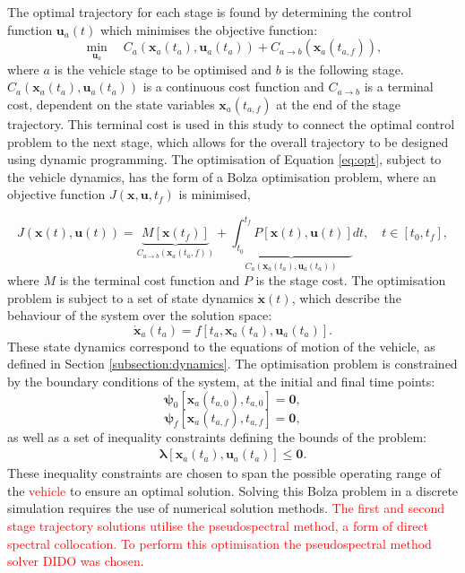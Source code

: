 \documentclass[journal]{new-aiaa}
\begin{document}
 The optimal trajectory for each stage is found by determining the control function $\textbf{u}_a(t)$ which minimises the objective function:
\begin{equation} \label{eq:opt}
\min\limits_{\textbf{u}_a} \quad C_a(\textbf{x}_a(t_a),\textbf{u}_a(t_a)) + C_{a\rightarrow  b}(\textbf{x}_a(t_{a,f})),
\end{equation}
where $a$ is the vehicle stage to be optimised and $b$ is the following stage. $ C_a(\textbf{x}_a(t_a),\textbf{u}_a(t_a))$ is a continuous cost function and $C_{{a\rightarrow b}}$ is a terminal cost, dependent on the state variables $\textbf{x}_a(t_{a,f})$ at the end of the stage trajectory. This terminal cost is used in this study to connect the optimal control problem to the next stage, which allows for the overall trajectory to be designed using dynamic programming.
The optimisation of Equation \ref{eq:opt}, subject to the vehicle dynamics, has the form of a Bolza optimisation problem, where an objective function $J(\textbf{x},\textbf{u},t_f)$ is minimised,

\begin{equation} \label{eq:cost}
J(\textbf{x}(t),\textbf{u}(t)) = \underbrace{M[\textbf{x}(t_f)]}_{C_{a\rightarrow  b}(\textbf{x}_a(t_a,{f}))} +   \underbrace{\int_{t_0}^{t_f} P[\textbf{x}(t),\textbf{u}(t)]}_{ C_a(\textbf{x}_a(t_a),\textbf{u}_a(t_a))} dt, \quad t \in [t_0,t_f],
\end{equation}
where $M$ is the terminal cost function and $P$ is the stage cost. The optimisation problem is subject to a set of state dynamics $\dot{\textbf{x}}(t)$, which describe the behaviour of the system over the solution space: 
\begin{equation} \label{eq:state}
\dot{\textbf{x}}_a(t_a) = f[t_a,\textbf{x}_a(t_a),\textbf{u}_a(t_a)].
\end{equation}
These state dynamics correspond to the equations of motion of the vehicle, as defined in Section \ref{subsection:dynamics}.
The optimisation problem is constrained by the boundary conditions of the system, at the initial and final time points:
\begin{equation}
\bm{\psi}_0[\textbf{x}_a(t_{a,0}), t_{a,0}] = \textbf{0},
\end{equation}
\begin{equation} \label{eq:2}
\bm{\psi}_f[\textbf{x}_a(t_{a,f}), t_{a,f}] = \textbf{0},
\end{equation}
as well as a set of inequality constraints defining the bounds of the problem:
\begin{eqnarray}
\bm{\lambda}[\textbf{x}_a(t_a),\textbf{u}_a(t_a)] \leq \textbf{0}.
\end{eqnarray}
 These inequality constraints are chosen to span the possible operating range of the \textcolor{red}{vehicle} to ensure an optimal solution. 
 Solving this Bolza problem in a discrete simulation requires the use of numerical solution methods. 
 \textcolor{red}{The first and second stage trajectory solutions utilise the pseudospectral method, a form of direct spectral collocation\cite{Fahroo2000,Rao2009}. To perform this optimisation the pseudospectral method solver DIDO was chosen\cite{Ross}}.
\end{document}
